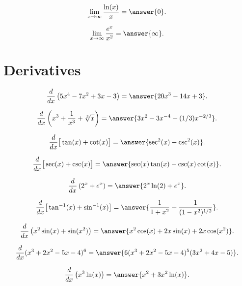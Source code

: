 \documentclass[handout]{ximera}
\begin{document}
\begin{problem}
\[\lim_{x \to \infty} \frac{\ln(x)}{x} = \answer{0}.\]

\[\lim_{x \to \infty} \frac{e^x}{x^2} = \answer{\infty}.\]
\end{problem}

\section{Derivatives}

\begin{problem}
\[\frac{d}{dx}\left(5x^4 - 7x^2 + 3x -3  \right) = \answer{20x^3 - 14x + 3}.\]
\end{problem}


\begin{problem}
\[\frac{d}{dx}\left(x^3 + \frac{1}{x^3} + \sqrt[3]x  \right) = \answer{3x^2 -3x^{-4} +(1/3)x^{-2/3}}.\]
\end{problem}


\begin{problem}
\[\frac{d}{dx}\big[\tan(x) + \cot(x)  \big] = \answer{\sec^2(x) - \csc^2(x)}.\]

\[\frac{d}{dx}\big[\sec(x) + \csc(x)  \big] = \answer{\sec(x)\tan(x) - \csc(x)\cot(x)}.\]
\end{problem}

\begin{problem}
\[\frac{d}{dx}\left(2^x + e^x  \right) = \answer{2^x \ln(2) + e^x}.\]
\end{problem}

\begin{problem}
\[\frac{d}{dx}\big[\tan^{-1}(x) + \sin^{-1}(x)  \big] = 
\answer{\frac{1}{1+x^2} + \frac{1}{(1-x^2)^{1/2}}}.\]
\end{problem}

\begin{problem}
\[\frac{d}{dx}\left(x^2 \sin(x) + \sin(x^2) \right) = \answer{x^2\cos(x) + 2x\sin(x) + 2x\cos(x^2)}.\]
\end{problem}


\begin{problem}
\[\frac{d}{dx}(x^3 + 2x^2 - 5x - 4 )^6 = \answer{6(x^3 + 2x^2 - 5x - 4 )^5(3x^2 + 4x -5)}.\]
\end{problem}




\begin{problem}
\[\frac{d}{dx}\left(x^3 \ln(x) \right) = \answer{x^2 + 3x^2\ln(x)}.\]
\end{problem}
\end{document}
